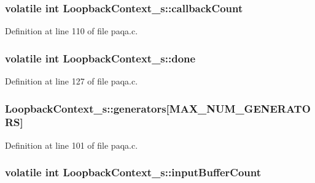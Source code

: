 \subsubsection[{\texorpdfstring{callback\+Count}{callbackCount}}]{\setlength{\rightskip}{0pt plus 5cm}volatile {\bf int} Loopback\+Context\+\_\+s\+::callback\+Count}\hypertarget{struct_loopback_context__s_a692f77b0071a2c85de22b37da5d58c68}{}\label{struct_loopback_context__s_a692f77b0071a2c85de22b37da5d58c68}


Definition at line 110 of file paqa.\+c.

\subsubsection[{\texorpdfstring{done}{done}}]{\setlength{\rightskip}{0pt plus 5cm}volatile {\bf int} Loopback\+Context\+\_\+s\+::done}\hypertarget{struct_loopback_context__s_a46672c5851dcece86dd45040fc271e99}{}\label{struct_loopback_context__s_a46672c5851dcece86dd45040fc271e99}


Definition at line 127 of file paqa.\+c.

\subsubsection[{\texorpdfstring{generators}{generators}}]{ Loopback\+Context\+\_\+s\+::generators\mbox{[}{\bf M\+A\+X\+\_\+\+N\+U\+M\+\_\+\+G\+E\+N\+E\+R\+A\+T\+O\+RS}\mbox{]}}\hypertarget{struct_loopback_context__s_af5271da39a934e3478a74f6b4b7ec144}{}\label{struct_loopback_context__s_af5271da39a934e3478a74f6b4b7ec144}


Definition at line 101 of file paqa.\+c.

\subsubsection[{\texorpdfstring{input\+Buffer\+Count}{inputBufferCount}}]{\setlength{\rightskip}{0pt plus 5cm}volatile {\bf int} Loopback\+Context\+\_\+s\+::input\+Buffer\+Count}\hypertarget{struct_loopback_context__s_ab3ea16136ef5a74d38292545cba5f011}{}\label{struct_loopback_context__s_ab3ea16136ef5a74d38292545cba5f011}


